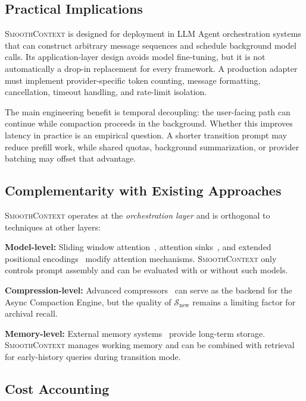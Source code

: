 \documentclass[10pt,twocolumn]{article}
\newcommand{\sys}{\textsc{SmoothContext}}
\begin{document}
\subsection{Practical Implications}

\sys{} is designed for deployment in LLM Agent orchestration systems that can construct arbitrary message sequences and schedule background model calls. Its application-layer design avoids model fine-tuning, but it is not automatically a drop-in replacement for every framework. A production adapter must implement provider-specific token counting, message formatting, cancellation, timeout handling, and rate-limit isolation.

The main engineering benefit is temporal decoupling: the user-facing path can continue while compaction proceeds in the background. Whether this improves latency in practice is an empirical question. A shorter transition prompt may reduce prefill work, while shared quotas, background summarization, or provider batching may offset that advantage.

\subsection{Complementarity with Existing Approaches}

\sys{} operates at the \emph{orchestration layer} and is orthogonal to techniques at other layers:

\textbf{Model-level:} Sliding window attention~\cite{beltagy2020longformer}, attention sinks~\cite{xiao2024efficient}, and extended positional encodings~\cite{chen2023extending} modify attention mechanisms. \sys{} only controls prompt assembly and can be evaluated with or without such models.

\textbf{Compression-level:} Advanced compressors~\cite{jiang2023llmlingua, chevalier2023adapting} can serve as the backend for the Async Compaction Engine, but the quality of $\mathcal{S}_{\mathrm{new}}$ remains a limiting factor for archival recall.

\textbf{Memory-level:} External memory systems~\cite{packer2023memgpt, wang2024augmenting} provide long-term storage. \sys{} manages working memory and can be combined with retrieval for early-history queries during transition mode.

\subsection{Cost Accounting}
\end{document}
